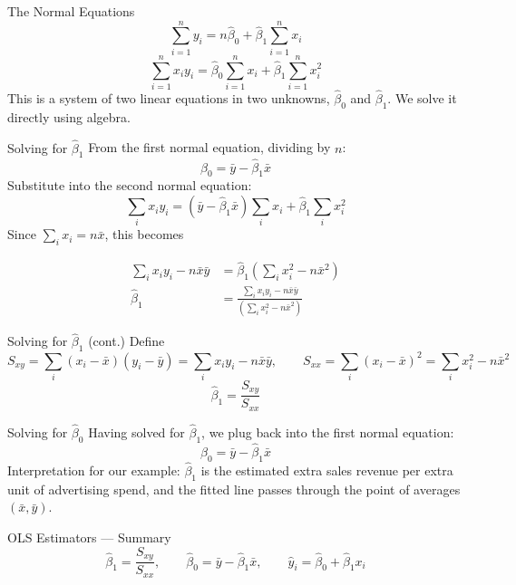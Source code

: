 \begin{frame}{The Normal Equations}
	\[
		\sum_{i=1}^n y_i = n\hat\beta_0 + \hat\beta_1 \sum_{i=1}^n x_i
	\]
	\[
		\sum_{i=1}^n x_i y_i = \hat\beta_0 \sum_{i=1}^n x_i + \hat\beta_1 \sum_{i=1}^n x_i^2
	\]
	\svspace{0.5em}
	\pause
	This is a system of two linear equations in two unknowns, $\hat\beta_0$ and $\hat\beta_1$. We solve it directly using algebra.
\end{frame}


\begin{frame}{Solving for $\hat\beta_1$}
	From the first normal equation, dividing by $n$:
	\[
		\hat\beta_0 = \bar y - \hat\beta_1 \bar x
	\]
	\pause
	Substitute into the second normal equation:
	\[
		\sum_i x_i y_i = (\bar y - \hat\beta_1 \bar x)\sum_i x_i + \hat\beta_1 \sum_i x_i^2
	\]
	\pause
	Since $\sum_i x_i = n\bar x$, this becomes

	\begin{align*}
		\sum_i x_i y_i - n\bar x \bar y &= \hat\beta_1\left(\sum_i x_i^2 - n\bar x^2\right) \\
		\hat\beta_1 &= \frac{\sum_i x_i y_i - n\bar x \bar y}{\left(\sum_i x_i^2 - n\bar x^2\right)}
	\end{align*}
\end{frame}


\begin{frame}{Solving for $\hat\beta_1$ (cont.)}
	Define
	\[
		S_{xy} = \sum_i (x_i - \bar x)(y_i - \bar y) = \sum_i x_i y_i - n\bar x\bar y, \qquad
		S_{xx} = \sum_i (x_i - \bar x)^2 = \sum_i x_i^2 - n\bar x^2
	\]
	\pause
	\[
		\boxed{\hat\beta_1 = \frac{S_{xy}}{S_{xx}}}
	\]
\end{frame}


\begin{frame}{Solving for $\hat\beta_0$}
	Having solved for $\hat\beta_1$, we plug back into the first normal equation:
	\[
		\boxed{\hat\beta_0 = \bar y - \hat\beta_1 \bar x}
	\]
	\svspace{0.5em}
	\pause
	Interpretation for our example: $\hat\beta_1$ is the estimated extra sales revenue per extra unit of advertising spend, and the fitted line passes through the point of averages $(\bar x, \bar y)$.
\end{frame}


\begin{frame}{OLS Estimators --- Summary}
	\[
		\hat\beta_1 = \frac{S_{xy}}{S_{xx}}, \qquad \hat\beta_0 = \bar y - \hat\beta_1 \bar x, \qquad \hat y_i = \hat\beta_0 + \hat\beta_1 x_i
	\]
\end{frame}


